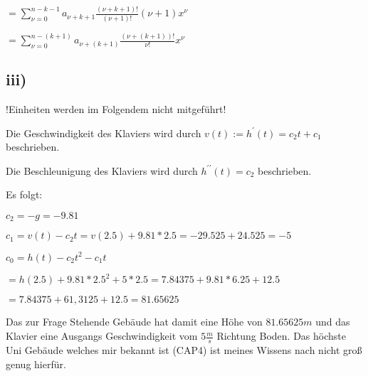 $ = \sum\limits^{n-k-1}_{\nu=0} a_{\nu+k+1} \frac{(\nu+k+1)!}{(\nu+1)!} (\nu+1)x^{\nu}$

$ = \sum\limits^{n -(k+1)}_{\nu=0} a_{\nu+(k+1)} \frac{(\nu+(k+1))!}{\nu!} x^{\nu}$


\pagebreak
\subsection*{iii)}

\begin{large}
!Einheiten werden im Folgendem nicht mitgeführt!
\end{large}

Die Geschwindigkeit des Klaviers wird durch $v(t) := h^{\prime}(t) = c_{2}t + c_{1}$ beschrieben.

Die Beschleunigung des Klaviers wird durch $h^{\prime\prime}(t) = c_{2}$ beschrieben.

Es folgt:

$c_{2} = -g = -9.81$

$c_{1} = v(t) - c_{2}t = v(2.5) + 9.81*2.5 = -29.525 + 24.525 = -5$

$c_{0} = h(t) - c_{2}t^{2} - c_{1}t$

$= h(2.5) + 9.81 * 2.5^{2} + 5 * 2.5 = 7.84375 + 9.81 * 6.25 + 12.5$
 
$ = 7.84375 + 61,3125 + 12.5 = 81.65625$

Das zur Frage Stehende Gebäude hat damit eine Höhe von $81.65625m$ und das Klavier eine Ausgangs Geschwindigkeit vom $5\frac{m}{s}$ Richtung Boden.
Das höchste Uni Gebäude welches mir bekannt ist (CAP4) ist meines Wissens nach nicht groß genug hierfür.
       
 